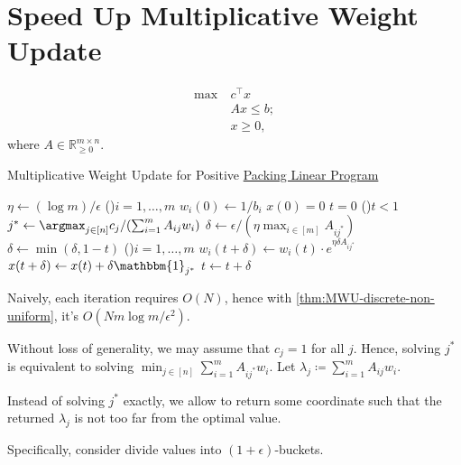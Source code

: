 \section{Speed Up Multiplicative Weight Update}
\[
	\begin{aligned}
		\max~ & c^{\top} x  \\
		      & Ax \leq b ; \\
		      & x \geq 0,
	\end{aligned}
\]
where \(A \in \mathbb{R} _{\geq 0}^{m \times n}\).

\begin{algorithm}[H]\label{algo:MWU-discrete-linear}
	\DontPrintSemicolon{}
	\caption{Multiplicative Weight Update for Positive \hyperref[def:packing-LP]{Packing Linear Program}}
	\BlankLine

	\(\eta \gets (\log m) / \epsilon \)\;
	\For(){\(i = 1, \dots , m\)}{
		\(w_i(0) \gets 1 / b_i\)\;
	}
	\(x(0) = 0\)
	\(t = 0\)\;
	\;
	\While(){\(t < 1\)}{
	\(j^{\ast} \gets \argmax_{j \in [n]} c_j / (\sum_{i=1}^{m} A_{ij} w_i)\)\;
	\(\delta \gets \epsilon / (\eta \max _{i \in [m]} A_{ij^{\ast} })\)
	\(\delta \gets \min (\delta , 1 - t)\)
	\For(){\(i = 1, \dots , m\)}{
		\(w_i(t+\delta ) \gets w_i(t) \cdot e^{\eta \delta A_{ij^{\ast} }}\)\;
	}
	\(x (t+\delta ) \gets x (t) + \delta \mathbbm{1}_{j^{\ast} }\)\;
	\(t \gets t + \delta \)\;
	}
	\;
\end{algorithm}

Naively, each iteration requires \(O(N)\), hence with \autoref{thm:MWU-discrete-non-uniform}, it's \(O(N m \log m / \epsilon ^2)\).

Without loss of generality, we may assume that \(c_j = 1\) for all \(j\). Hence, solving \(j^{\ast} \) is equivalent to solving \(\min _{j \in [n]} \sum_{i=1}^{m} A_{ij^{\ast} } w_i\). Let \(\lambda _j \coloneqq \sum_{i=1}^{m} A_{ij} w_i\).

\begin{intuition}
	Instead of solving \(j^{\ast} \) exactly, we allow to return some coordinate such that the returned \(\lambda _j\) is not too far from the optimal value.
\end{intuition}

Specifically, consider divide values into \((1 + \epsilon )\)-buckets.

